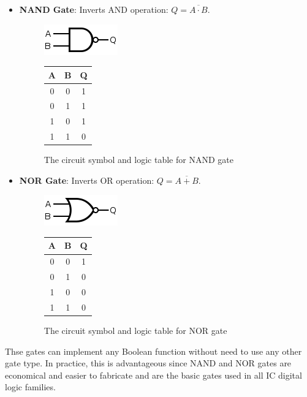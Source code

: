 \begin{itemize}

    \item \textbf{NAND Gate}: Inverts AND operation: $Q=\overline{A \cdot B}$.
        
    \begin{figure}[H]
        \centering
        \includegraphics[width=0.30\columnwidth]{images/nand.png}
        \qquad
        \begin{tabular}[b]{|c|c|c|}\hline
        A & B & Q \\ \hline
        0 & 0 & 1 \\ 
        0 & 1 & 1 \\
        1 & 0 & 1 \\
        1 & 1 & 0 \\ \hline
        \end{tabular}
        \caption{The circuit symbol and logic table for NAND gate}
    \end{figure}

    \item \textbf{NOR Gate}: Inverts OR operation: $Q=\overline{A + B}$.
        
    \begin{figure}[H]
        \centering
        \includegraphics[width=0.30\columnwidth]{images/nor.png}
        \qquad
        \begin{tabular}[b]{|c|c|c|}\hline
        A & B & Q \\ \hline
        0 & 0 & 1 \\ 
        0 & 1 & 0 \\
        1 & 0 & 0 \\
        1 & 1 & 0 \\ \hline
        \end{tabular}
        \caption{The circuit symbol and logic table for NOR gate}
    \end{figure}
    
\end{itemize}

Thse gates can implement any Boolean function without need to use any other gate type. In practice, this is advantageous since NAND and NOR gates are economical and easier to fabricate and are the basic gates used in all IC digital logic families.

